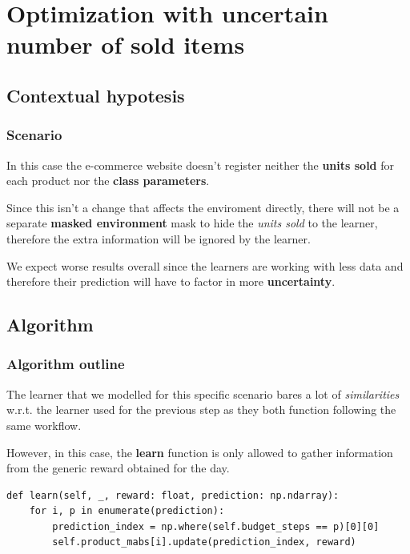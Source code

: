 \chapter{Optimization with uncertain number of sold items}
\label{chap:unc_items}

\section{Contextual hypotesis}

\subsection{Scenario}

In this case the e-commerce website doesn't register neither the \textbf{units sold} for each product nor the \textbf{class parameters}.

Since this isn't a change that affects the enviroment directly, there will not be a separate \textbf{masked environment} mask to hide the \textit{units sold} to the learner, therefore the extra information will be ignored by the learner.

We expect worse results overall since the learners are working with less data and therefore their prediction will have to factor in more \textbf{uncertainty}.

\section{Algorithm}

\subsection{Algorithm outline}

The learner that we modelled for this specific scenario bares a lot of \textit{similarities} w.r.t. the learner used for the previous step as they both function following the same workflow.

However, in this case, the \textbf{learn} function is only allowed to gather information from the generic reward obtained for the day.

\vspace*{1em}

\begin{lstlisting}[style=Python, basicstyle=\tiny, numbers=none]
def learn(self, _, reward: float, prediction: np.ndarray):
	for i, p in enumerate(prediction):
		prediction_index = np.where(self.budget_steps == p)[0][0]
		self.product_mabs[i].update(prediction_index, reward)
\end{lstlisting}

